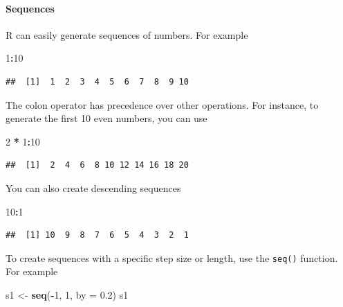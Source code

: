 \documentclass[
]{article}
\newenvironment{Shaded}{\begin{snugshade}}{\end{snugshade}}
\newcommand{\AttributeTok}[1]{\textcolor[rgb]{0.13,0.29,0.53}{#1}}
\newcommand{\DecValTok}[1]{\textcolor[rgb]{0.00,0.00,0.81}{#1}}
\newcommand{\FloatTok}[1]{\textcolor[rgb]{0.00,0.00,0.81}{#1}}
\newcommand{\FunctionTok}[1]{\textcolor[rgb]{0.13,0.29,0.53}{\textbf{#1}}}
\newcommand{\NormalTok}[1]{#1}
\newcommand{\OtherTok}[1]{\textcolor[rgb]{0.56,0.35,0.01}{#1}}
\newcommand{\SpecialCharTok}[1]{\textcolor[rgb]{0.81,0.36,0.00}{\textbf{#1}}}
\begin{document}
\hypertarget{sequences}{%
\paragraph{Sequences}\label{sequences}}

R can easily generate sequences of numbers. For example

\begin{Shaded}
\begin{Highlighting}[]
\DecValTok{1}\SpecialCharTok{:}\DecValTok{10}
\end{Highlighting}
\end{Shaded}

\begin{verbatim}
##  [1]  1  2  3  4  5  6  7  8  9 10
\end{verbatim}

The colon operator has precedence over other operations. For instance,
to generate the first 10 even numbers, you can use

\begin{Shaded}
\begin{Highlighting}[]
\DecValTok{2} \SpecialCharTok{*} \DecValTok{1}\SpecialCharTok{:}\DecValTok{10}
\end{Highlighting}
\end{Shaded}

\begin{verbatim}
##  [1]  2  4  6  8 10 12 14 16 18 20
\end{verbatim}

You can also create descending sequences

\begin{Shaded}
\begin{Highlighting}[]
\DecValTok{10}\SpecialCharTok{:}\DecValTok{1}
\end{Highlighting}
\end{Shaded}

\begin{verbatim}
##  [1] 10  9  8  7  6  5  4  3  2  1
\end{verbatim}

To create sequences with a specific step size or length, use the
\texttt{seq()} function. For example

\begin{Shaded}
\begin{Highlighting}[]
\NormalTok{s1 }\OtherTok{\textless{}{-}} \FunctionTok{seq}\NormalTok{(}\SpecialCharTok{{-}}\DecValTok{1}\NormalTok{, }\DecValTok{1}\NormalTok{, }\AttributeTok{by =} \FloatTok{0.2}\NormalTok{)}
\NormalTok{s1}
\end{Highlighting}
\end{Shaded}
\end{document}

